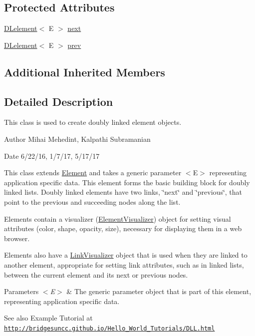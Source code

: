 \subsection*{Protected Attributes}
\begin{DoxyCompactItemize}
\item 
\hyperlink{classbridges_1_1base_1_1_d_lelement}{D\+Lelement}$<$ E $>$ \hyperlink{classbridges_1_1base_1_1_d_lelement_ae2672f6718bf5e1758386d33e59d9340}{next}
\item 
\hyperlink{classbridges_1_1base_1_1_d_lelement}{D\+Lelement}$<$ E $>$ \hyperlink{classbridges_1_1base_1_1_d_lelement_a6eba4876f820b75ac6bde01d7dea9da7}{prev}
\end{DoxyCompactItemize}
\subsection*{Additional Inherited Members}


\subsection{Detailed Description}
This class is used to create doubly linked element objects. 

\begin{DoxyAuthor}{Author}
Mihai Mehedint, Kalpathi Subramanian
\end{DoxyAuthor}
\begin{DoxyDate}{Date}
6/22/16, 1/7/17, 5/17/17
\end{DoxyDate}
This class extends \hyperlink{classbridges_1_1base_1_1_element}{Element} and takes a generic parameter $<$\+E$>$ representing application specific data. This element forms the basic building block for doubly linked lists. Doubly linked elements have two links, \char`\"{}next\char`\"{} and \char`\"{}previous\char`\"{}, that point to the previous and succeeding nodes along the list.

Elements contain a visualizer (\hyperlink{classbridges_1_1base_1_1_element_visualizer}{Element\+Visualizer}) object for setting visual attributes (color, shape, opacity, size), necessary for displaying them in a web browser.

Elements also have a \hyperlink{classbridges_1_1base_1_1_link_visualizer}{Link\+Visualizer} object that is used when they are linked to another element, appropriate for setting link attributes, such as in linked lists, between the current element and its next or previous nodes.


\begin{DoxyParams}{Parameters}
{\em $<$\+E$>$} & The generic parameter object that is part of this element, representing application specific data.\\
\hline
\end{DoxyParams}
\begin{DoxySeeAlso}{See also}
Example Tutorial at ~\newline
 \href{http://bridgesuncc.github.io/Hello_World_Tutorials/DLL.html}{\tt http\+://bridgesuncc.\+github.\+io/\+Hello\+\_\+\+World\+\_\+\+Tutorials/\+D\+L\+L.\+html} 
\end{DoxySeeAlso}


